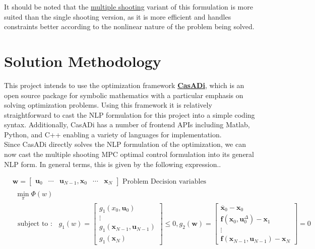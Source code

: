 \documentclass[12px]{article}
\begin{document}
    \noindent It should be noted that the \underline{multiple shooting} variant of this formulation is more suited than the single shooting version, as it is more efficient and handles constraints better according to the nonlinear nature of the problem being solved.


    \section*{Solution Methodology}

    This project intends to use the optimization framework \textbf{\underline{CasADi}}, which is an open source package for symbolic mathematics with a particular emphasis on solving optimization problems. Using this framework it is relatively straightforward to cast the NLP formulation for this project into a simple coding syntax. Additionally, CasADi has a number of frontend APIs including Matlab, Python, and C++ enabling a variety of languages for implementation. \\

    \noindent Since CasADi directly solves the NLP formulation of the optimization, we can now cast the multiple shooting MPC optimal control formulation into its general NLP form. In general terms, this is given by the following expression..

    $$
    \begin{aligned}
    &\mathbf{w}=\left[\begin{array}{lllll}
    \mathbf{u}_{0} & \cdots & \mathbf{u}_{N-1}, \mathbf{x}_{0} & \cdots & \mathbf{x}_{N}
    \end{array}\right] \text { Problem Decision variables }\\
    &\begin{array}{l}
    \min _{\pi} \Phi(w) \\
    \text { subject to }: & g_{1}(w)=\left[\begin{array}{c}
    g_{1}\left(x_{0}, \mathbf{u}_{0}\right) \\
    \vdots \\
    g_{1}\left(\mathbf{x}_{N-1}, \mathbf{u}_{N-1}\right) \\
    g_{1}\left(\mathbf{x}_{N}\right)
    \end{array}\right] \leq 0, g_{2}(\mathbf{w})=\left[\begin{array}{c}
    \overline{\mathbf{x}}_{0}-\mathbf{x}_{0} \\
    \mathbf{f}\left(\mathbf{x}_{0}, \mathbf{u}_{0}^{\Delta}\right)-\mathbf{x}_{1} \\
    \vdots \\
    \mathbf{f}\left(\mathbf{x}_{N-1}, \mathbf{u}_{N-1}\right)-\mathbf{x}_{N}
    \end{array}\right]=0
    \end{array}
    \end{aligned}
    $$
\end{document}

